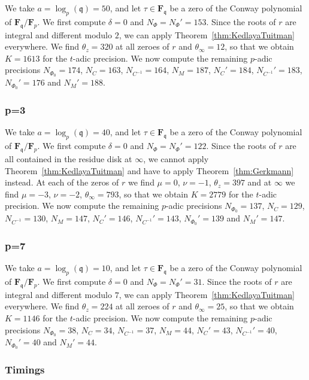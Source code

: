 \documentclass[a4paper,11pt]{article}
\numberwithin{equation}{section}
\newcommand{\FF}{\mathbf{F}} %
\theoremstyle{definition}
\begin{document}
We take $a=\log_p(\mathfrak{q})=50$, and let $\tau \in \FF_{\mathfrak{q}}$ 
be a zero of the Conway polynomial of $\FF_{\mathfrak{q}}/\FF_p$. We first compute
$\delta=0$ and $N_{\Phi}=N_{\Phi}'=153$. Since the roots of $r$ are integral and 
different modulo $2$, we can apply Theorem~\ref{thm:KedlayaTuitman} everywhere. 
We find $\theta_z=320$ at all zeroes of $r$ and $\theta_{\infty}=12$, so that we
obtain $K=1613$ for the $t$-adic precision. We now compute the remaining $p$-adic 
precisions
$N_{\Phi_0}=174$, $N_C=163$, $N_{C^{-1}}=164$, $N_M=187$, 
$N_C'=184$, $N_{C^{-1}}'=183$, $N_{\Phi_0}'=176$ and $N_M'=188$.

\subsubsection{p=3}

We take $a=\log_p(\mathfrak{q})=40$, and let $\tau \in \FF_{\mathfrak{q}}$ 
be a zero of the Conway polynomial of $\FF_{\mathfrak{q}}/\FF_p$. We first compute
$\delta=0$ and $N_{\Phi}=N_{\Phi}'=122$. Since the roots of $r$ are all contained
in the residue disk at $\infty$, we cannot apply Theorem~\ref{thm:KedlayaTuitman}
and have to apply Theorem~\ref{thm:Gerkmann} instead. At each of the zeros of $r$
we find $\mu=0$, $\nu=-1$, $\theta_z=397$ and at $\infty$ we find 
$\mu=-3$, $\nu=-2$, $\theta_{\infty}=793$, so that we obtain $K=2779$ for the
$t$-adic precision. We now compute the remaining $p$-adic 
precisions
$N_{\Phi_0}=137$, $N_C=129$, $N_{C^{-1}}=130$, $N_M=147$, 
$N_C'=146$, $N_{C^{-1}}'=143$, $N_{\Phi_0}'=139$ and $N_M'=147$.

\subsubsection{p=7}

We take $a=\log_p(\mathfrak{q})=10$, and let $\tau \in \FF_{\mathfrak{q}}$ 
be a zero of the Conway polynomial of $\FF_{\mathfrak{q}}/\FF_p$. We first compute
$\delta=0$ and $N_{\Phi}=N_{\Phi}'=31$. Since the roots of $r$ are integral and 
different modulo $7$, we can apply Theorem~\ref{thm:KedlayaTuitman} everywhere. 
We find $\theta_z=224$ at all zeroes of $r$ and $\theta_{\infty}=25$, so that we
obtain $K=1146$ for the $t$-adic precision. We now compute the remaining $p$-adic 
precisions
$N_{\Phi_0}=38$, $N_C=34$, $N_{C^{-1}}=37$, $N_M=44$, 
$N_C'=43$, $N_{C^{-1}}'=40$, $N_{\Phi_0}'=40$ and $N_M'=44$.

\subsubsection{Timings}
\end{document}

